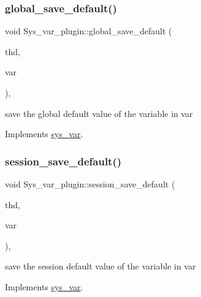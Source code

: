 \subsubsection{\texorpdfstring{global\+\_\+save\+\_\+default()}{global\_save\_default()}}
{\footnotesize\ttfamily void Sys\+\_\+var\+\_\+plugin\+::global\+\_\+save\+\_\+default (\begin{DoxyParamCaption}\item[{T\+HD $\ast$}]{thd,  }\item[{\mbox{\hyperlink{classset__var}{set\+\_\+var}} $\ast$}]{var }\end{DoxyParamCaption})\hspace{0.3cm}{\ttfamily [inline]}, {\ttfamily [virtual]}}

save the global default value of the variable in var 

Implements \mbox{\hyperlink{classsys__var}{sys\+\_\+var}}.

\mbox{\label{classSys__var__plugin_af959987c1a741e2b421be3924efe8eb0}} 
\subsubsection{\texorpdfstring{session\+\_\+save\+\_\+default()}{session\_save\_default()}}
{\footnotesize\ttfamily void Sys\+\_\+var\+\_\+plugin\+::session\+\_\+save\+\_\+default (\begin{DoxyParamCaption}\item[{T\+HD $\ast$}]{thd,  }\item[{\mbox{\hyperlink{classset__var}{set\+\_\+var}} $\ast$}]{var }\end{DoxyParamCaption})\hspace{0.3cm}{\ttfamily [inline]}, {\ttfamily [virtual]}}

save the session default value of the variable in var 

Implements \mbox{\hyperlink{classsys__var}{sys\+\_\+var}}.

\mbox{\label{classSys__var__plugin_a8f5be6fb5160c21e4fc859f71dff2c0a}} 
